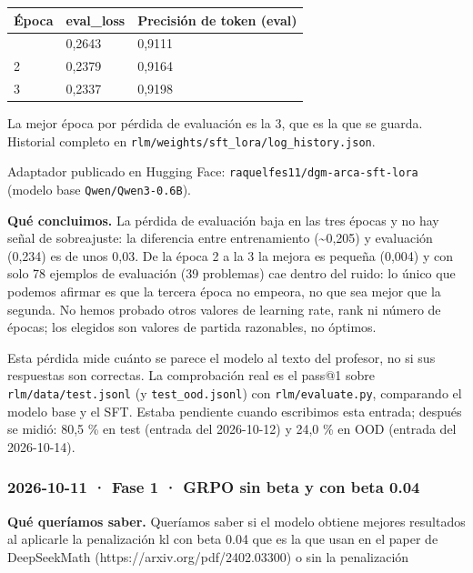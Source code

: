 {\def\LTcaptype{none} %
\small\setlength{\tabcolsep}{3pt}
\begin{longtable}[]{@{}lll@{}}
\toprule\noalign{}
Época & eval\_\allowbreak{}loss & Precisión de token (eval) \\
\midrule\noalign{}
\endhead
\bottomrule\noalign{}
\endlastfoot
1 & 0,2643 & 0,9111 \\
2 & 0,2379 & 0,9164 \\
3 & 0,2337 & 0,9198 \\
\end{longtable}
}

La mejor época por pérdida de evaluación es la 3, que es la que se guarda. Historial completo en
\texttt{rlm/\allowbreak{}weights/\allowbreak{}sft\_\allowbreak{}lora/\allowbreak{}log\_\allowbreak{}history.json}.

Adaptador publicado en Hugging Face: \texttt{raquelfes11/\allowbreak{}dgm-arca-sft-lora} (modelo base \texttt{Qwen/\allowbreak{}Qwen3-0.6B}).

\textbf{Qué concluimos.} La pérdida de evaluación baja en las tres épocas y no hay señal de
sobreajuste: la diferencia entre entrenamiento (\textasciitilde0,205) y evaluación (0,234) es de unos 0,03. De
la época 2 a la 3 la mejora es pequeña (0,004) y con solo 78 ejemplos de evaluación (39
problemas) cae dentro del ruido: lo único que podemos afirmar es que la tercera época no
empeora, no que sea mejor que la segunda. No hemos probado otros valores de learning rate, rank
ni número de épocas; los elegidos son valores de partida razonables, no óptimos.

Esta pérdida mide cuánto se parece el modelo al texto del profesor, no si sus respuestas son
correctas. La comprobación real es el pass@1 sobre \texttt{rlm/\allowbreak{}data/\allowbreak{}test.jsonl} (y \texttt{test\_\allowbreak{}ood.jsonl})
con \texttt{rlm/\allowbreak{}evaluate.py}, comparando el modelo base y el SFT. Estaba pendiente cuando escribimos
esta entrada; después se midió: 80,5 \% en test (entrada del 2026-10-12) y 24,0 \% en OOD (entrada
del 2026-10-14).

\subsubsection{2026-10-11 · Fase 1 · GRPO sin beta y con beta 0.04}

\textbf{Qué queríamos saber.} Queríamos saber si el modelo obtiene mejores resultados al aplicarle la penalización kl con beta 0.04 que es la que usan en el paper de DeepSeekMath (https://arxiv.org/pdf/2402.03300) o sin la penalización

